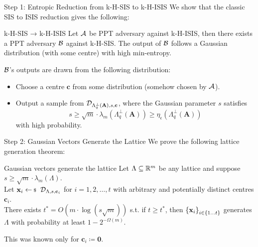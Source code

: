 \documentclass[xcolor=table,10pt,aspectratio=169]{beamer}
\renewcommand{\vec}[1]{\ensuremath{\mathbf{#1}}\xspace}
\providecommand{\mat}[1]{\ensuremath{\vec{#1}}\xspace}
\begin{document}
\begin{frame}[label={sec:org82a1a8d}]{Step 1: Entropic Reduction from k-H-SIS to k-H-ISIS}
We show that the classic SIS to ISIS reduction gives the following:

\begin{alertblock}{k-H-SIS → k-H-ISIS}
Let \(\mathcal{A}\) be PPT adversary against k-H-ISIS, then there exists a PPT adversary \(\mathcal{B}\) against k-H-SIS. The output of \(\mathcal{B}\) follows a Gaussian distribution (with some centre) with high min-entropy.
\end{alertblock}

\(\mathcal{B}\)'s outputs are drawn from the following distribution:

\begin{itemize}
\item Choose a centre \(\vec{c}\) from some distribution (somehow chosen by \(\mathcal{A}\)).
\item Output a sample from \(\ddv_{\Lambda_q^\bot(\mat{A}), s, \vec{c}}\), where the Gaussian parameter \(s\) satisfies \[s \geq \sqrt{m} \cdot \lambda_m(\Lambda_q^\bot(\mat{A})) \geq \eta_{\epsilon}(\Lambda_q^\bot(\mat{A}))\] with high probability.
\end{itemize}
\end{frame}

\begin{frame}[label={sec:orgf2e6747}]{Step 2: Gaussian Vectors Generate the Lattice}
We prove the following lattice generation theorem:

\begin{alertblock}{Gaussian vectors generate the lattice}
Let \(\Lambda \subseteq \mathbb{R}^m\) be any lattice and suppose \(s \geq \sqrt{m} \cdot \lambda_m(\Lambda)\).\\[0pt]
Let \(\vec{x}_i \sample \ddv_{\Lambda,s,\vec{c}_i}\) for \(i = 1,2,\ldots,t\) with arbitrary and potentially distinct centres \(\vec{c}_i\).\\[0pt]
There exists \(t^* = O(m \cdot \log(s \sqrt{m}))\) s.t. if \(t \geq t^*\), then \(\set{\vec{x}_i}_{i\in \{1 \ldots t\}}\) generates \(\Lambda\) with probability at least \(1-2^{-\Omega(m)}\).
\end{alertblock}

This was known only for \(\vec{c}_i \coloneqq \vec{0}\).
\end{frame}
\end{document}
